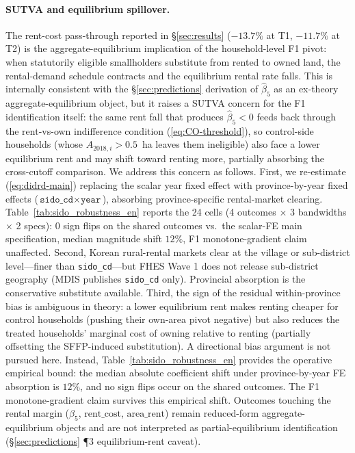 \documentclass[12pt, a4paper]{article}
\begin{document}
\paragraph{SUTVA and equilibrium spillover.} The rent-cost pass-through reported in \S\ref{sec:results} ($-13.7\%$ at T1, $-11.7\%$ at T2) is the aggregate-equilibrium implication of the household-level F1 pivot: when statutorily eligible smallholders substitute from rented to owned land, the rental-demand schedule contracts and the equilibrium rental rate falls. This is internally consistent with the §\ref{sec:predictions} derivation of $\hat\beta_5$ as an ex-theory aggregate-equilibrium object, but it raises a SUTVA concern for the F1 identification itself: the same rent fall that produces $\hat\beta_5 < 0$ feeds back through the rent-vs-own indifference condition (\ref{eq:CO-threshold}), so control-side households (whose $A_{2018,i} > 0.5$~ha leaves them ineligible) also face a lower equilibrium rent and may shift toward renting more, partially absorbing the cross-cutoff comparison. We address this concern as follows. First, we re-estimate (\ref{eq:didrd-main}) replacing the scalar year fixed effect with province-by-year fixed effects ($\texttt{sido\_cd} \times \texttt{year}$), absorbing province-specific rental-market clearing. Table~\ref{tab:sido_robustness_en} reports the 24 cells (4 outcomes $\times$ 3 bandwidths $\times$ 2 specs): 0 sign flips on the shared outcomes vs.\ the scalar-FE main specification, median magnitude shift $12\%$, F1 monotone-gradient claim unaffected. Second, Korean rural-rental markets clear at the village or sub-district level---finer than \texttt{sido\_cd}---but FHES Wave 1 does not release sub-district geography (MDIS publishes \texttt{sido\_cd} only). Provincial absorption is the conservative substitute available. Third, the sign of the residual within-province bias is ambiguous in theory: a lower equilibrium rent makes renting cheaper for control households (pushing their own-area pivot negative) but also reduces the treated households' marginal cost of owning relative to renting (partially offsetting the SFFP-induced substitution). A directional bias argument is not pursued here. Instead, Table~\ref{tab:sido_robustness_en} provides the operative empirical bound: the median absolute coefficient shift under province-by-year FE absorption is $12\%$, and no sign flips occur on the shared outcomes. The F1 monotone-gradient claim survives this empirical shift. Outcomes touching the rental margin ($\hat\beta_5$, $\text{rent\_cost}$, $\text{area\_rent}$) remain reduced-form aggregate-equilibrium objects and are not interpreted as partial-equilibrium identification (\S\ref{sec:predictions} ¶3 equilibrium-rent caveat).
\end{document}
